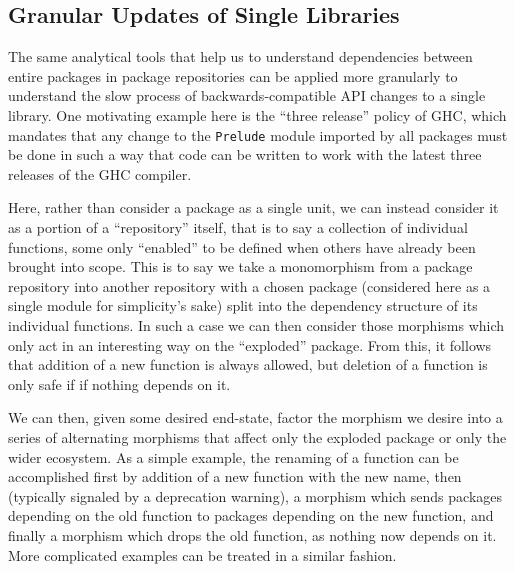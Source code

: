 \documentclass[hoptionsi,review,screen,format=sigconf]{acmart}
\theoremstyle{definition}
\begin{document}

\subsection{Granular Updates of Single Libraries}
The same analytical tools that help us to understand dependencies between entire packages in package repositories can be applied more granularly to understand the slow process of backwards-compatible API changes to a single library. One motivating example here is the ``three release'' policy of GHC, which mandates that any change to the \texttt{Prelude} module imported by all packages must be done in such a way that code can be written to work with the latest three releases of the GHC compiler.


Here, rather than consider a package as a single unit, we can instead consider it as a portion of a ``repository'' itself, that is to say a collection of individual functions, some only ``enabled'' to be defined when others have already been brought into scope. This is to say we take a monomorphism from a package repository into another repository with a chosen package (considered here as a single module for simplicity's sake) split into the dependency structure of its individual functions. In such a case we can then consider those morphisms which only act in an interesting way on the ``exploded'' package. From this, it follows that addition of a new function is always allowed, but deletion of a function is only safe if if nothing depends on it.

We can then, given some desired end-state, factor the morphism we desire into a series of alternating morphisms that affect only the exploded package or only the wider ecosystem. As a simple example, the renaming of a function can be accomplished first by addition of a new function with the new name, then (typically signaled by a deprecation warning), a morphism which sends packages depending on the old function to packages depending on the new function, and finally a morphism which drops the old function, as nothing now depends on it. More complicated examples can be treated in a similar fashion.
\end{document}
